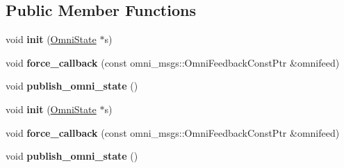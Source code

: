 \subsection*{Public Member Functions}
\begin{DoxyCompactItemize}
\item 
\hypertarget{class_phantom_r_o_s_a3acae78503fd6b8e2886935e0bf50390}{void {\bfseries init} (\hyperlink{struct_omni_state}{Omni\-State} $\ast$s)}\label{class_phantom_r_o_s_a3acae78503fd6b8e2886935e0bf50390}

\item 
\hypertarget{class_phantom_r_o_s_a16ae8412d0fc6259ab7bd9b0d0798222}{void {\bfseries force\-\_\-callback} (const omni\-\_\-msgs\-::\-Omni\-Feedback\-Const\-Ptr \&omnifeed)}\label{class_phantom_r_o_s_a16ae8412d0fc6259ab7bd9b0d0798222}

\item 
\hypertarget{class_phantom_r_o_s_a7a4ec0bfc4061479fb14eafed29ca126}{void {\bfseries publish\-\_\-omni\-\_\-state} ()}\label{class_phantom_r_o_s_a7a4ec0bfc4061479fb14eafed29ca126}

\item 
\hypertarget{class_phantom_r_o_s_a3acae78503fd6b8e2886935e0bf50390}{void {\bfseries init} (\hyperlink{struct_omni_state}{Omni\-State} $\ast$s)}\label{class_phantom_r_o_s_a3acae78503fd6b8e2886935e0bf50390}

\item 
\hypertarget{class_phantom_r_o_s_a16ae8412d0fc6259ab7bd9b0d0798222}{void {\bfseries force\-\_\-callback} (const omni\-\_\-msgs\-::\-Omni\-Feedback\-Const\-Ptr \&omnifeed)}\label{class_phantom_r_o_s_a16ae8412d0fc6259ab7bd9b0d0798222}

\item 
\hypertarget{class_phantom_r_o_s_a7a4ec0bfc4061479fb14eafed29ca126}{void {\bfseries publish\-\_\-omni\-\_\-state} ()}\label{class_phantom_r_o_s_a7a4ec0bfc4061479fb14eafed29ca126}

\end{DoxyCompactItemize}
